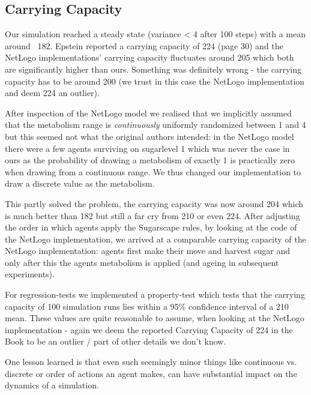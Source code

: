 \subsection{Carrying Capacity}
Our simulation reached a steady state (variance < 4 after 100 steps) with a mean around ~182. Epstein reported a carrying capacity of 224 (page 30) and the NetLogo implementations' \cite{weaver_replicating_2009} carrying capacity fluctuates around 205 which both are significantly higher than ours. Something was definitely wrong - the carrying capacity has to be around 200 (we trust in this case the NetLogo implementation and deem 224 an outlier).

After inspection of the NetLogo model we realised that we implicitly assumed that the metabolism range is \textit{continuously} uniformly randomized between 1 and 4 but this seemed not what the original authors intended: in the NetLogo model there were a few agents surviving on sugarlevel 1 which was never the case in ours as the probability of drawing a metabolism of exactly 1 is practically zero when drawing from a continuous range. We thus changed our implementation to draw a discrete value as the metabolism. %

This partly solved the problem, the carrying capacity was now around 204 which is much better than 182 but still a far cry from 210 or even 224. After adjusting the order in which agents apply the Sugarscape rules, by looking at the code of the NetLogo implementation, we arrived at a comparable carrying capacity of the NetLogo implementation: agents first make their move and harvest sugar and only after this the agents metabolism is applied (and ageing in subsequent experiments).

For regression-tests we implemented a property-test which tests that the carrying capacity of 100 simulation runs lies within a 95\% confidence interval of a 210 mean. These values are quite reasonable to assume, when looking at the NetLogo implementation - again we deem the reported Carrying Capacity of 224 in the Book to be an outlier / part of other details we don't know.

One lesson learned is that even such seemingly minor things like continuous vs. discrete or order of actions an agent makes, can have substantial impact on the dynamics of a simulation.

